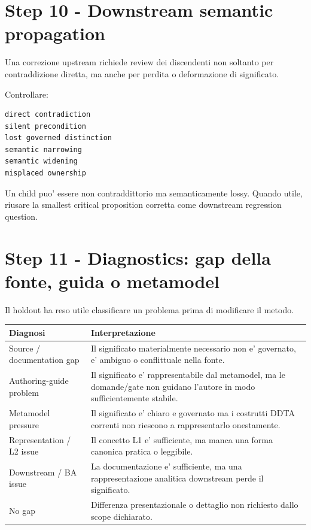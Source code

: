 \documentclass[11pt,a4paper]{article}
\begin{document}
\section{Step 10 - Downstream semantic propagation}
\workingtag

Una correzione upstream richiede review dei discendenti non soltanto per contraddizione diretta, ma anche per perdita o deformazione di significato.

Controllare:
\begin{lstlisting}
direct contradiction
silent precondition
lost governed distinction
semantic narrowing
semantic widening
misplaced ownership
\end{lstlisting}

Un child puo' essere non contraddittorio ma semanticamente lossy. Quando utile, riusare la smallest critical proposition corretta come downstream regression question.

\section{Step 11 - Diagnostics: gap della fonte, guida o metamodel}
\holdouttag

Il holdout ha reso utile classificare un problema prima di modificare il metodo.

\begin{tabularx}{\textwidth}{L{45mm}Y}
\toprule
\textbf{Diagnosi} & \textbf{Interpretazione} \\
\midrule
Source / documentation gap & Il significato materialmente necessario non e' governato, e' ambiguo o conflittuale nella fonte. \\
Authoring-guide problem & Il significato e' rappresentabile dal metamodel, ma le domande/gate non guidano l'autore in modo sufficientemente stabile. \\
Metamodel pressure & Il significato e' chiaro e governato ma i costrutti DDTA correnti non riescono a rappresentarlo onestamente. \\
Representation / L2 issue & Il concetto L1 e' sufficiente, ma manca una forma canonica pratica o leggibile. \\
Downstream / BA issue & La documentazione e' sufficiente, ma una rappresentazione analitica downstream perde il significato. \\
No gap & Differenza presentazionale o dettaglio non richiesto dallo scope dichiarato. \\
\bottomrule
\end{tabularx}
\end{document}
